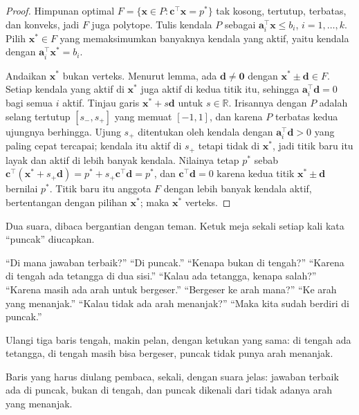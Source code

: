 \begin{proof}
Himpunan optimal $F=\{\mathbf{x}\in P:\mathbf{c}^{\top}\mathbf{x}=p^{*}\}$ tak kosong,
tertutup, terbatas, dan konveks, jadi $F$ juga polytope. Tulis kendala $P$ sebagai
$\mathbf{a}_{i}^{\top}\mathbf{x}\le b_{i}$, $i=1,\dots,k$. Pilih $\mathbf{x}^{*}\in F$
yang memaksimumkan banyaknya kendala yang aktif, yaitu kendala dengan
$\mathbf{a}_{i}^{\top}\mathbf{x}^{*}=b_{i}$.

Andaikan $\mathbf{x}^{*}$ bukan verteks. Menurut lemma, ada $\mathbf{d}\ne\mathbf{0}$
dengan $\mathbf{x}^{*}\pm\mathbf{d}\in F$. Setiap kendala yang aktif di
$\mathbf{x}^{*}$ juga aktif di kedua titik itu, sehingga
$\mathbf{a}_{i}^{\top}\mathbf{d}=0$ bagi semua $i$ aktif. Tinjau garis
$\mathbf{x}^{*}+s\mathbf{d}$ untuk $s\in\mathbb{R}$. Irisannya dengan $P$ adalah selang
tertutup $[s_{-},s_{+}]$ yang memuat $[-1,1]$, dan karena $P$ terbatas kedua ujungnya
berhingga. Ujung $s_{+}$ ditentukan oleh kendala dengan $\mathbf{a}_{i}^{\top}\mathbf{d}>0$ yang
paling cepat tercapai; kendala itu aktif di $s_{+}$ tetapi tidak di $\mathbf{x}^{*}$, jadi
titik baru itu layak dan aktif di lebih banyak kendala. Nilainya tetap $p^{*}$ sebab
$\mathbf{c}^{\top}(\mathbf{x}^{*}+s_{+}\mathbf{d})=p^{*}+s_{+}\mathbf{c}^{\top}
\mathbf{d}=p^{*}$, dan $\mathbf{c}^{\top}\mathbf{d}=0$ karena kedua titik
$\mathbf{x}^{*}\pm\mathbf{d}$ bernilai $p^{*}$. Titik baru itu anggota $F$ dengan lebih banyak kendala
aktif, bertentangan dengan pilihan $\mathbf{x}^{*}$; maka $\mathbf{x}^{*}$ verteks.
\end{proof}

\begin{bacakeras}
Dua suara, dibaca bergantian dengan teman. Ketuk meja sekali setiap kali kata ``puncak''
diucapkan.

``Di mana jawaban terbaik?'' ``Di puncak.''
``Kenapa bukan di tengah?'' ``Karena di tengah ada tetangga di dua sisi.''
``Kalau ada tetangga, kenapa salah?'' ``Karena masih ada arah untuk bergeser.''
``Bergeser ke arah mana?'' ``Ke arah yang menanjak.''
``Kalau tidak ada arah menanjak?'' ``Maka kita sudah berdiri di puncak.''

Ulangi tiga baris tengah, makin pelan, dengan ketukan yang sama: di tengah ada tetangga, di
tengah masih bisa bergeser, puncak tidak punya arah menanjak.

Baris yang harus diulang pembaca, sekali, dengan suara jelas: jawaban terbaik ada di puncak,
bukan di tengah, dan puncak dikenali dari tidak adanya arah yang menanjak.
\end{bacakeras}

